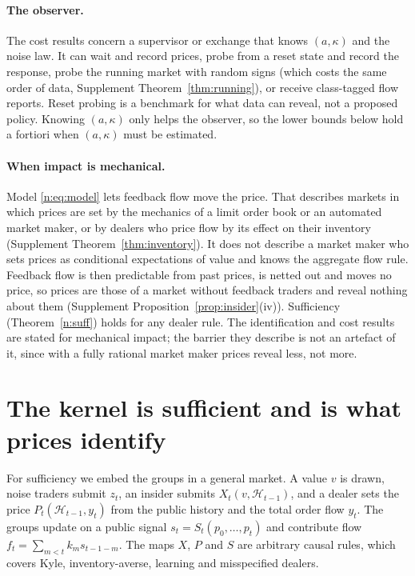 \documentclass[12pt]{article}
\theoremstyle{definition}
\theoremstyle{remark}
\begin{document}
\paragraph{The observer.} The cost results concern a supervisor or exchange that knows $(a,\kappa)$ and the noise law. It can wait and record prices, probe from a reset state and record the response, probe the running market with random signs (which costs the same order of data, Supplement Theorem~\ref{thm:running}), or receive class-tagged flow reports. Reset probing is a benchmark for what data can reveal, not a proposed policy. Knowing $(a,\kappa)$ only helps the observer, so the lower bounds below hold a fortiori when $(a,\kappa)$ must be estimated.

\paragraph{When impact is mechanical.} Model \eqref{n:eq:model} lets feedback flow move the price. That describes markets in which prices are set by the mechanics of a limit order book or an automated market maker, or by dealers who price flow by its effect on their inventory (Supplement Theorem~\ref{thm:inventory}). It does not describe a market maker who sets prices as conditional expectations of value and knows the aggregate flow rule. Feedback flow is then predictable from past prices, is netted out and moves no price, so prices are those of a market without feedback traders and reveal nothing about them (Supplement Proposition~\ref{prop:insider}(iv)). Sufficiency (Theorem~\ref{n:suff}) holds for any dealer rule. The identification and cost results are stated for mechanical impact; the barrier they describe is not an artefact of it, since with a fully rational market maker prices reveal less, not more.

\section{The kernel is sufficient and is what prices identify}\label{n:suff_sec}

For sufficiency we embed the groups in a general market. A value $v$ is drawn, noise traders submit $z_t$, an insider submits $X_t(v,\mathcal H_{t-1})$, and a dealer sets the price $P_t(\mathcal H_{t-1},y_t)$ from the public history and the total order flow $y_t$. The groups update on a public signal $s_t=S_t(p_0,\ldots,p_t)$ and contribute flow $f_t=\sum_{m<t}k_ms_{t-1-m}$. The maps $X$, $P$ and $S$ are arbitrary causal rules, which covers Kyle, inventory-averse, learning and misspecified dealers.
\end{document}
